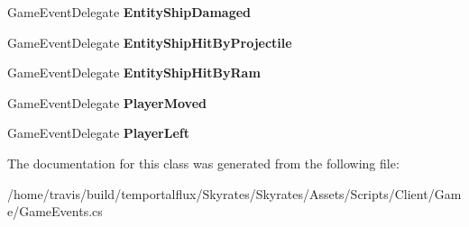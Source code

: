 \begin{DoxyCompactItemize}
\item 
\hypertarget{class_skyrates_1_1_client_1_1_game_1_1_event_1_1_game_events_aabf8f827a2ff9600d184b6f01dc9b72e}{Game\-Event\-Delegate {\bfseries Entity\-Ship\-Damaged}}\label{class_skyrates_1_1_client_1_1_game_1_1_event_1_1_game_events_aabf8f827a2ff9600d184b6f01dc9b72e}

\item 
\hypertarget{class_skyrates_1_1_client_1_1_game_1_1_event_1_1_game_events_a89d17208f4b6f259f8fc03ead86b6a13}{Game\-Event\-Delegate {\bfseries Entity\-Ship\-Hit\-By\-Projectile}}\label{class_skyrates_1_1_client_1_1_game_1_1_event_1_1_game_events_a89d17208f4b6f259f8fc03ead86b6a13}

\item 
\hypertarget{class_skyrates_1_1_client_1_1_game_1_1_event_1_1_game_events_a418c2702fb43809be5279b4c0d877972}{Game\-Event\-Delegate {\bfseries Entity\-Ship\-Hit\-By\-Ram}}\label{class_skyrates_1_1_client_1_1_game_1_1_event_1_1_game_events_a418c2702fb43809be5279b4c0d877972}

\item 
\hypertarget{class_skyrates_1_1_client_1_1_game_1_1_event_1_1_game_events_a347e7a35ad1bbb862f1a4028c2e375ef}{Game\-Event\-Delegate {\bfseries Player\-Moved}}\label{class_skyrates_1_1_client_1_1_game_1_1_event_1_1_game_events_a347e7a35ad1bbb862f1a4028c2e375ef}

\item 
\hypertarget{class_skyrates_1_1_client_1_1_game_1_1_event_1_1_game_events_a5dc1bfc1852ff08c98f6c521b96b1b07}{Game\-Event\-Delegate {\bfseries Player\-Left}}\label{class_skyrates_1_1_client_1_1_game_1_1_event_1_1_game_events_a5dc1bfc1852ff08c98f6c521b96b1b07}

\end{DoxyCompactItemize}


The documentation for this class was generated from the following file\-:\begin{DoxyCompactItemize}
\item 
/home/travis/build/temportalflux/\-Skyrates/\-Skyrates/\-Assets/\-Scripts/\-Client/\-Game/Game\-Events.\-cs\end{DoxyCompactItemize}
